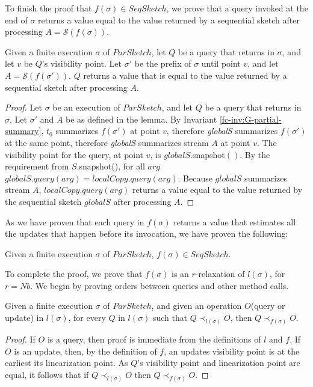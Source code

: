 To finish the proof that $f(\sigma) \in SeqSketch$, we prove that a query invoked at the end of $\sigma$
returns a value equal to the value returned by a sequential sketch after processing $A={\mathcal{S}}(f(\sigma))$.
\begin{lemma}
    Given a finite execution $\sigma$ of $ParSketch$, let $Q$ be a query that returns
    in $\sigma$, and let $v$ be $Q$'s visibility point. Let $\sigma'$ be the prefix
    of $\sigma$ until point $v$, and let $A={\mathcal{S}}(f(\sigma'))$. $Q$ returns a value
    that is equal to the value returned by a sequential sketch after processing $A$.
    \label{fc-lemma:query-correctness}
\end{lemma}
\begin{proof}
    Let $\sigma$ be an execution of $ParSketch$, and let $Q$ be a query that returns in $\sigma$.
    Let $\sigma'$ and $A$ be as defined in the lemma. By Invariant \ref{fc-inv:G-partial-summary}, 
    $t_0$ summarizes $f(\sigma')$ at point $v$, therefore \emph{globalS} 
    summarizes $f(\sigma')$ at the same point, therefore \emph{globalS} summarizes 
    stream $A$ at point $v$. The visibility point for the query, at point $v$,
    is $globalS.$snapshot$()$. By the requirement from $S$.snapshot(), for all $arg$ 
    $globalS.query(arg)=localCopy.query(arg)$. Because $globalS$ summarizes
    stream $A$, $localCopy.query(arg)$ returns a value equal to the value
    returned by the sequential sketch $globalS$ after processing $A$.
\end{proof}

As we have proven that each query in $f(\sigma)$ returns a value that estimates all
the updates that happen before its invocation, we have proven the following:
\begin{lemma}
    Given a finite execution $\sigma$ of $ParSketch$, $f(\sigma) \in SeqSketch$.
    \label{fc-lemma:f-in-seqsketch}
\end{lemma}

To complete the proof, we prove that $f(\sigma)$ is an $r$-relaxation of $l(\sigma)$, for $r=Nb$.
We begin by proving orders between queries and other method calls.
\begin{lemma}
    Given a finite execution $\sigma$ of $ParSketch$, and given an operation $O$(query or update) in $l(\sigma)$,
    for every $Q$ in $l(\sigma)$ such that $Q \prec_{l(\sigma)} O$,
    then $Q \prec_{f(\sigma)} O$.
    \label{fc-lemma:QueryOrders}
\end{lemma}
\begin{proof}
    If $O$ is a query,
    then proof is immediate from the definitions of $l$ and $f$.
    If $O$ is an update, then, by the definition of $f$, an updates visibility point
    is at the earliest its linearization point.
    As $Q$'s visibility point and linearization point are equal, it follows
    that if  $Q \prec_{l(\sigma)} O$ then $Q \prec_{f(\sigma)} O$.
\end{proof}

